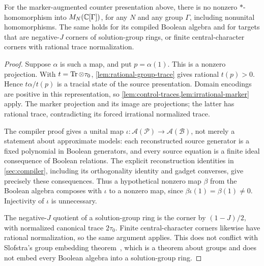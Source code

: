 \begin{theorem}\label{thm:group-trace-obstruction}
For the marker-augmented counter presentation above, there is no nonzero $*$-homomorphism into $M_N(\mathbb C[\Gamma])$, for any $N$ and any group $\Gamma$, including nonunital homomorphisms. The same holds for its compiled Boolean algebra and for targets that are negative-$J$ corners of solution-group rings, or finite central-character corners with rational trace normalization.
\end{theorem}
\begin{proof}
Suppose $\alpha$ is such a map, and put $p=\alpha(1)$. This is a nonzero projection. With $t=\operatorname{Tr}\otimes\tau_0$, \cref{lem:rational-group-trace} gives rational $t(p)>0$. Hence $t\alpha/t(p)$ is a tracial state of the source presentation. Domain encodings are positive in this representation, so \cref{lem:control-traces,lem:irrational-marker} apply. The marker projection and its image are projections; the latter has rational trace, contradicting its forced irrational normalized trace.

The compiler proof gives a unital map $\iota:\mathcal A(\mathcal P)\to\mathcal A(\mathcal B)$, not merely a statement about approximate models: each reconstructed source generator is a fixed polynomial in Boolean generators, and every source equation is a finite ideal consequence of Boolean relations. The explicit reconstruction identities in \cref{sec:compiler}, including its orthogonality identity and gadget converses, give precisely these consequences. Thus a hypothetical nonzero map $\beta$ from the Boolean algebra composes with $\iota$ to a nonzero map, since $\beta\iota(1)=\beta(1)\ne0$. Injectivity of $\iota$ is unnecessary.

The negative-$J$ quotient of a solution-group ring is the corner by $(1-J)/2$, with normalized canonical trace $2\tau_0$. Finite central-character corners likewise have rational normalization, so the same argument applies. This does not conflict with Slofstra's group embedding theorem~\cite{Slo20}, which is a theorem about groups and does not embed every Boolean algebra into a solution-group ring.
\end{proof}

